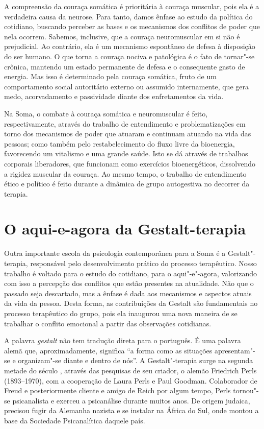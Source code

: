 A compreensão da couraça somática é prioritária à couraça muscular, pois
ela é a verdadeira causa da neurose. Para tanto, damos ênfase ao estudo
da política do cotidiano, buscando perceber as bases e os mecanismos dos
conflitos de poder que nela ocorrem. Sabemos, inclusive, que a couraça
neuromuscular em si não é prejudicial. Ao contrário, ela é um mecanismo
espontâneo de defesa à disposição do ser humano. O que torna a couraça
nociva e patológica é o fato de tornar"-se crônica, mantendo um estado
permanente de defesa e o consequente gasto de energia. Mas isso é
determinado pela couraça somática, fruto de um comportamento social
autoritário externo ou assumido internamente, que gera medo,
acorvadamento e passividade diante dos enfretamentos da vida.

Na Soma, o combate à couraça somática e neuromuscular é feito,
respectivamente, através do trabalho de entendimento e problematizações
em torno dos mecanismos de poder que atuaram e continuam atuando na vida
das pessoas; como também pelo restabelecimento do fluxo livre da
bioenergia, favorecendo um vitalismo e uma grande saúde. Isto se dá
através de trabalhos corporais liberadores, que funcionam como
exercícios bioenergéticos, dissolvendo a rigidez muscular da couraça. Ao
mesmo tempo, o trabalho de entendimento ético e político é feito
durante a dinâmica de grupo autogestiva no decorrer da terapia.

\section{O aqui-e-agora da Gestalt-terapia}

Outra importante escola da psicologia contemporânea para a Soma é a
Gestalt"-terapia, responsável pelo desenvolvimento prático do processo
terapêutico. Nosso trabalho é voltado para o estudo do cotidiano, para o
aqui"-e"-agora, valorizando com isso a percepção dos conflitos que estão
presentes na atualidade. Não que o passado seja descartado, mas a ênfase
é dada aos mecanismos e aspectos atuais da vida da pessoa. Desta forma,
as contribuições da Gestalt são fundamentais no processo terapêutico do
grupo, pois ela inaugurou uma nova maneira de se trabalhar o conflito
emocional a partir das observações cotidianas.

A palavra \emph{gestalt} não tem tradução direta para o português. É uma
palavra alemã que, aproximadamente, significa ``a forma como as
situações apresentam"-se e organizam"-se diante e dentro de nós''. A
Gestalt"-terapia surge na segunda metade do século , através das
pesquisas de seu criador, o alemão Friedrich Perls (1893--1970), com a
cooperação de Laura Perls e Paul Goodman. Colaborador de Freud e posteriormente cliente e amigo de Reich
por algum tempo, Perls tornou"-se psicanalista e exerceu a psicanálise
durante muitos anos. De origem judaica, precisou fugir da Alemanha
nazista e se instalar na África do Sul, onde montou a base da Sociedade
Psicanalítica daquele país.

